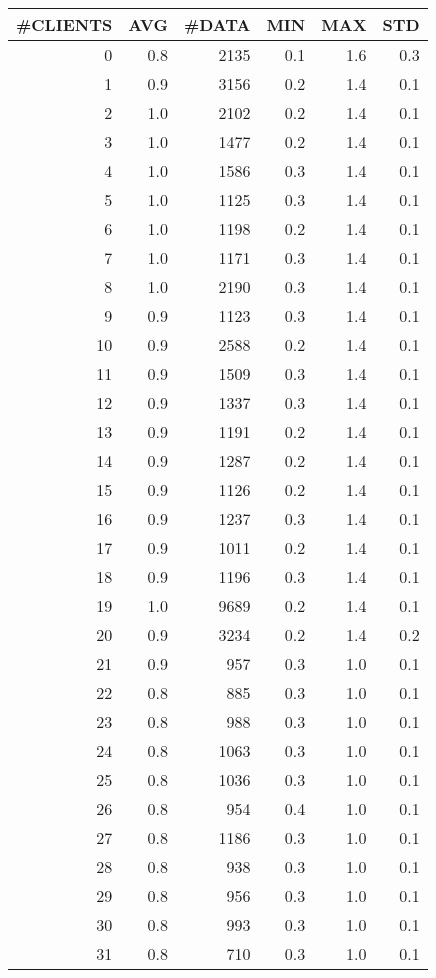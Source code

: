 \begin{tabular}{|r|r|r|r|r|r|}
\hline
 \#CLIENTS & AVG & \#DATA & MIN & MAX & STD\\
\hline
0 &  0.8 & 2135 & 0.1 & 1.6 & 0.3\\
1 &  0.9 & 3156 & 0.2 & 1.4 & 0.1\\
2 &  1.0 & 2102 & 0.2 & 1.4 & 0.1\\
3 &  1.0 & 1477 & 0.2 & 1.4 & 0.1\\
4 &  1.0 & 1586 & 0.3 & 1.4 & 0.1\\
5 &  1.0 & 1125 & 0.3 & 1.4 & 0.1\\
6 &  1.0 & 1198 & 0.2 & 1.4 & 0.1\\
7 &  1.0 & 1171 & 0.3 & 1.4 & 0.1\\
8 &  1.0 & 2190 & 0.3 & 1.4 & 0.1\\
9 &  0.9 & 1123 & 0.3 & 1.4 & 0.1\\
10 &  0.9 & 2588 & 0.2 & 1.4 & 0.1\\
11 &  0.9 & 1509 & 0.3 & 1.4 & 0.1\\
12 &  0.9 & 1337 & 0.3 & 1.4 & 0.1\\
13 &  0.9 & 1191 & 0.2 & 1.4 & 0.1\\
14 &  0.9 & 1287 & 0.2 & 1.4 & 0.1\\
15 &  0.9 & 1126 & 0.2 & 1.4 & 0.1\\
16 &  0.9 & 1237 & 0.3 & 1.4 & 0.1\\
17 &  0.9 & 1011 & 0.2 & 1.4 & 0.1\\
18 &  0.9 & 1196 & 0.3 & 1.4 & 0.1\\
19 &  1.0 & 9689 & 0.2 & 1.4 & 0.1\\
20 &  0.9 & 3234 & 0.2 & 1.4 & 0.2\\
21 &  0.9 & 957 & 0.3 & 1.0 & 0.1\\
22 &  0.8 & 885 & 0.3 & 1.0 & 0.1\\
23 &  0.8 & 988 & 0.3 & 1.0 & 0.1\\
24 &  0.8 & 1063 & 0.3 & 1.0 & 0.1\\
25 &  0.8 & 1036 & 0.3 & 1.0 & 0.1\\
26 &  0.8 & 954 & 0.4 & 1.0 & 0.1\\
27 &  0.8 & 1186 & 0.3 & 1.0 & 0.1\\
28 &  0.8 & 938 & 0.3 & 1.0 & 0.1\\
29 &  0.8 & 956 & 0.3 & 1.0 & 0.1\\
30 &  0.8 & 993 & 0.3 & 1.0 & 0.1\\
31 &  0.8 & 710 & 0.3 & 1.0 & 0.1\\

\end{tabular}
